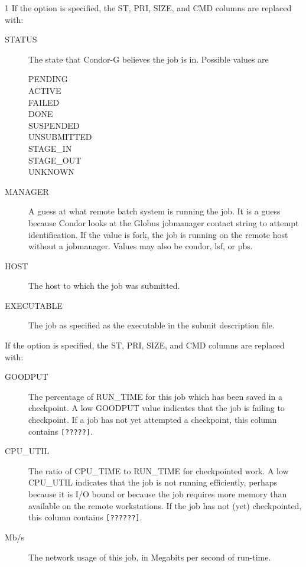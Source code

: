\begin{ManPage}{\label{man-condor-q}}{1}
If the  option is specified, the ST, PRI, SIZE, and CMD
columns are replaced with:
\begin{description}
\item[STATUS] The state that Condor-G believes the job is in.
Possible values are
  \begin{description}
    \item[PENDING]
    \item[ACTIVE]
    \item[FAILED]
    \item[DONE]
    \item[SUSPENDED]
    \item[UNSUBMITTED]
    \item[STAGE\_IN]
    \item[STAGE\_OUT]
    \item[UNKNOWN]
  \end{description}
\item[MANAGER] 
A guess at what remote batch system is running the job.
It is a guess because Condor looks at the Globus jobmanager contact
string to attempt identification.
If the value is fork, the job is running on the
remote host without a jobmanager.
Values may also be condor, lsf, or pbs.
\item[HOST] The host to which the job was submitted.
\item[EXECUTABLE] The job as specified as the executable in the
submit description file.
\end{description}

If the  option is specified, the ST, PRI, SIZE, and CMD
columns are replaced with:

\begin{description}
\item[GOODPUT] The percentage of RUN\_TIME for this job which has been
saved in a checkpoint.  A low GOODPUT value indicates that the job is
failing to checkpoint.  If a job has not yet attempted a checkpoint,
this column contains \texttt{[?????]}.
\item[CPU\_UTIL] The ratio of CPU\_TIME to RUN\_TIME for checkpointed
work.  A low CPU\_UTIL indicates that the job is not running
efficiently, perhaps because it is I/O bound or because the job
requires more memory than available on the remote workstations.  If
the job has not (yet) checkpointed, this column contains \texttt{[??????]}.
\item[Mb/s] The network usage of this job, in Megabits per second of
run-time.
\end{description}


\end{ManPage}
